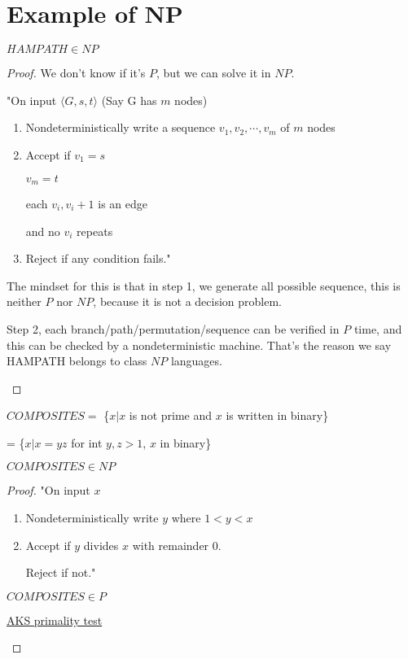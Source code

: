 \section{Example of NP}
\begin{theorem}
    \(HAMPATH \in NP\) 
\end{theorem}
\begin{proof}
    We don't know if it's \(P\), but we can solve it in \(NP\).

    "On input \(\langle G, s, t \rangle\) (Say G has \(m\) nodes)
    \begin{enumerate}
        \item Nondeterministically write a sequence \(v_1, v_2, \cdots, v_m\) of \(m\) nodes
        \item Accept if 
        \(v_1 = s\) 

        \(v_m = t\)  
        
        each \(v_i, v_i+1\) is an edge
        
        and no \(v_i\) repeats
        \item Reject if any condition fails."
    \end{enumerate}

    \begin{remark}
        The mindset for this is that in step 1, we generate all possible sequence, this is neither \(P\) nor \(NP\), because it is not a decision problem. 

        Step 2, each branch/path/permutation/sequence can be verified in \(P\) time, and this can be checked by a nondeterministic machine. 
        That's the reason we say HAMPATH belongs to class \(NP\) languages. 
    \end{remark}
\end{proof}

\begin{definition}[COMPOSITES]
    \(COMPOSITES = \) 
    \{\(x|x\) is not prime and \(x\) is written in binary\} 

    = \{\(x|x = yz\) for int \(y, z > 1\), \(x\) in binary\}
\end{definition}

\begin{theorem}
    \(COMPOSITES \in NP \) 
\end{theorem}
\begin{proof}
    "On input \(x\) 
    \begin{enumerate}
        \item Nondeterministically write \(y\) where \(1 < y < x\)
        \item Accept if \(y\) divides \(x\) with remainder \(0\).    

        Reject if not."
    \end{enumerate}

    \begin{note}[2002]
    \(COMPOSITES \in P\) 

    \href{https://en.wikipedia.org/wiki/AKS_primality_test}{AKS primality test}
    \end{note}
\end{proof}

